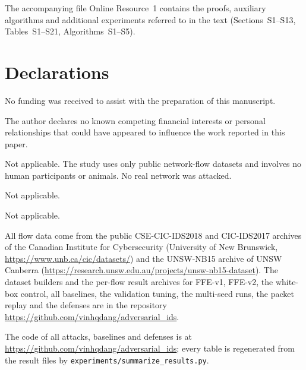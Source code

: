\documentclass[pdflatex,sn-basic,Numbered]{sn-jnl}%
\theoremstyle{thmstyleone}
\theoremstyle{thmstyletwo}
\theoremstyle{thmstylethree}
\begin{document}
\maketitle
\sloppy












\backmatter

The accompanying file Online Resource~1 contains the proofs, auxiliary algorithms and additional experiments referred to in the text (Sections~S1--S13, Tables~S1--S21, Algorithms~S1--S5).

\section*{Declarations}

No funding was received to assist with the preparation of this manuscript.

The author declares no known competing financial interests or personal relationships that could have appeared to influence the work reported in this paper.

Not applicable. The study uses only public network-flow datasets and involves no human participants or animals. No real network was attacked.

Not applicable.

Not applicable.

All flow data come from the public CSE-CIC-IDS2018 and CIC-IDS2017 archives of the Canadian Institute for Cybersecurity (University of New Brunswick, \url{https://www.unb.ca/cic/datasets/}) and the UNSW-NB15 archive of UNSW Canberra (\url{https://research.unsw.edu.au/projects/unsw-nb15-dataset}). The dataset builders and the per-flow result archives for FFE-v1, FFE-v2, the white-box control, all baselines, the validation tuning, the multi-seed runs, the packet replay and the defenses are in the repository \url{https://github.com/vinhqdang/adversarial_ids}.

The code of all attacks, baselines and defenses is at \url{https://github.com/vinhqdang/adversarial_ids}; every table is regenerated from the result files by \texttt{experiments/summarize\_results.py}.
\end{document}
